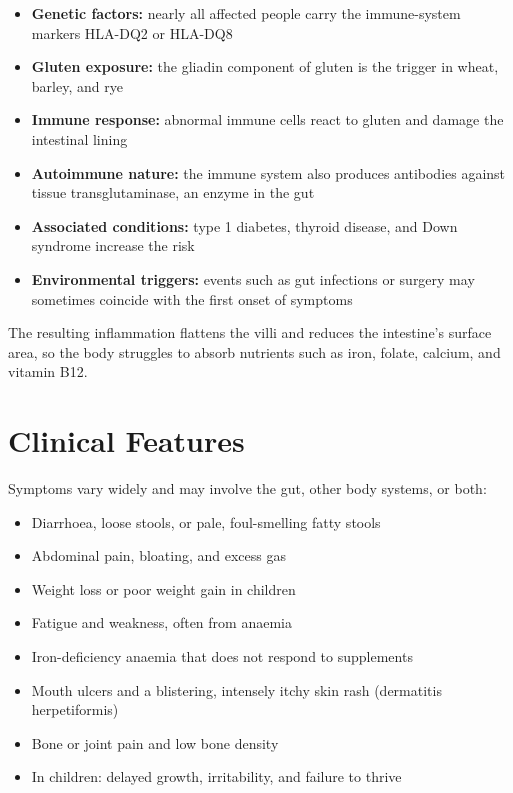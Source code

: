 \begin{itemize}
    \item \textbf{Genetic factors:} nearly all affected people carry the immune-system markers HLA-DQ2 or HLA-DQ8
    \item \textbf{Gluten exposure:} the gliadin component of gluten is the trigger in wheat, barley, and rye
    \item \textbf{Immune response:} abnormal immune cells react to gluten and damage the intestinal lining
    \item \textbf{Autoimmune nature:} the immune system also produces antibodies against tissue transglutaminase, an enzyme in the gut
    \item \textbf{Associated conditions:} type 1 diabetes, thyroid disease, and Down syndrome increase the risk
    \item \textbf{Environmental triggers:} events such as gut infections or surgery may sometimes coincide with the first onset of symptoms
\end{itemize}

The resulting inflammation flattens the villi and reduces the intestine's surface area, so the body struggles to absorb nutrients such as iron, folate, calcium, and vitamin B12.

\section*{Clinical Features}
Symptoms vary widely and may involve the gut, other body systems, or both:

\begin{itemize}
    \item Diarrhoea, loose stools, or pale, foul-smelling fatty stools
    \item Abdominal pain, bloating, and excess gas
    \item Weight loss or poor weight gain in children
    \item Fatigue and weakness, often from anaemia
    \item Iron-deficiency anaemia that does not respond to supplements
    \item Mouth ulcers and a blistering, intensely itchy skin rash (dermatitis herpetiformis)
    \item Bone or joint pain and low bone density
    \item In children: delayed growth, irritability, and failure to thrive
\end{itemize}

